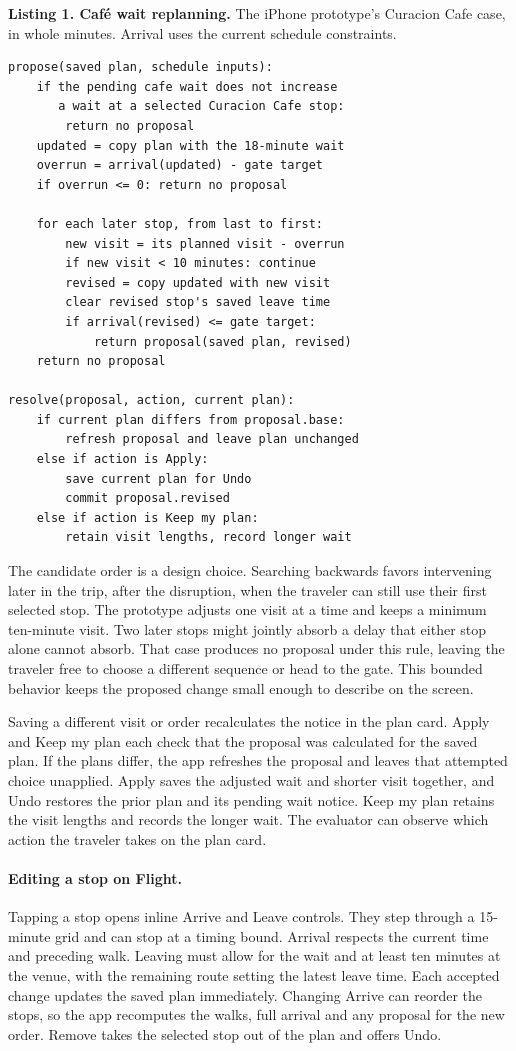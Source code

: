 \documentclass[sigconf,nonacm,balance=false]{acmart}
\begin{document}
\noindent\textbf{Listing 1. Caf\'e wait replanning.} The iPhone prototype's Curacion Cafe case, in whole minutes. Arrival uses the current schedule constraints.
\begin{verbatim}
propose(saved plan, schedule inputs):
    if the pending cafe wait does not increase
       a wait at a selected Curacion Cafe stop:
        return no proposal
    updated = copy plan with the 18-minute wait
    overrun = arrival(updated) - gate target
    if overrun <= 0: return no proposal

    for each later stop, from last to first:
        new visit = its planned visit - overrun
        if new visit < 10 minutes: continue
        revised = copy updated with new visit
        clear revised stop's saved leave time
        if arrival(revised) <= gate target:
            return proposal(saved plan, revised)
    return no proposal

resolve(proposal, action, current plan):
    if current plan differs from proposal.base:
        refresh proposal and leave plan unchanged
    else if action is Apply:
        save current plan for Undo
        commit proposal.revised
    else if action is Keep my plan:
        retain visit lengths, record longer wait
\end{verbatim}

The candidate order is a design choice. Searching backwards favors intervening later in the trip, after the disruption, when the traveler can still use their first selected stop. The prototype adjusts one visit at a time and keeps a minimum ten-minute visit. Two later stops might jointly absorb a delay that either stop alone cannot absorb. That case produces no proposal under this rule, leaving the traveler free to choose a different sequence or head to the gate. This bounded behavior keeps the proposed change small enough to describe on the screen.

Saving a different visit or order recalculates the notice in the plan card. Apply and Keep my plan each check that the proposal was calculated for the saved plan. If the plans differ, the app refreshes the proposal and leaves that attempted choice unapplied. Apply saves the adjusted wait and shorter visit together, and Undo restores the prior plan and its pending wait notice. Keep my plan retains the visit lengths and records the longer wait. The evaluator can observe which action the traveler takes on the plan card.

\paragraph{Editing a stop on Flight.} Tapping a stop opens inline Arrive and Leave controls. They step through a 15-minute grid and can stop at a timing bound. Arrival respects the current time and preceding walk. Leaving must allow for the wait and at least ten minutes at the venue, with the remaining route setting the latest leave time. Each accepted change updates the saved plan immediately. Changing Arrive can reorder the stops, so the app recomputes the walks, full arrival and any proposal for the new order. Remove takes the selected stop out of the plan and offers Undo.
\end{document}
